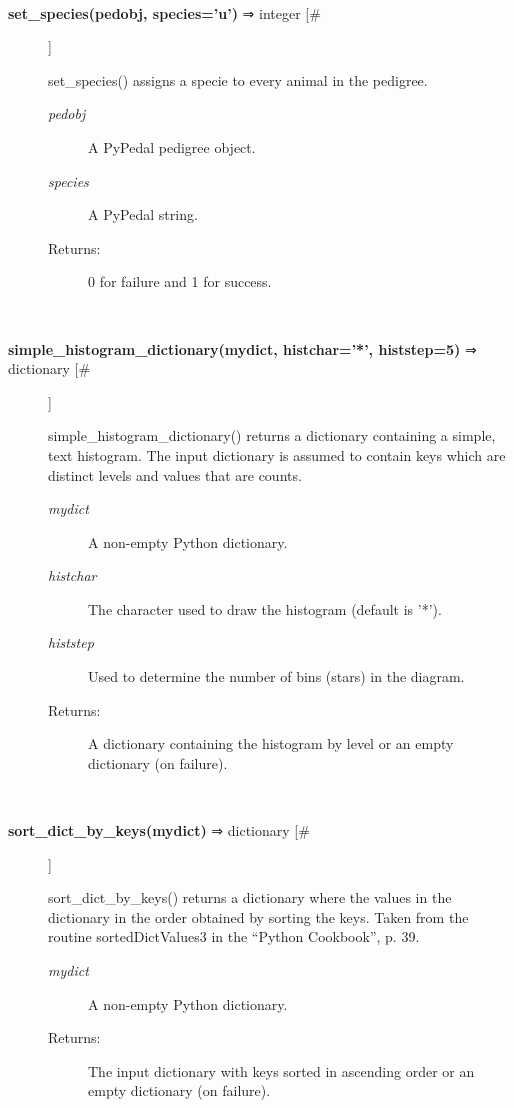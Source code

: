 \begin{description}
\begin{description}
\end{description}
\\ 

\item[\textbf{set\_species(pedobj, species='u')}
 ⇒ integer [\#]]

 set\_species() assigns a specie to every animal in the pedigree.
\begin{description}
\item[\emph{pedobj}
] A PyPedal pedigree object.
\item[\emph{species}
] A PyPedal string.
\item[Returns:] 0 for failure and 1 for success.

\end{description}
\\ 

\item[\textbf{simple\_histogram\_dictionary(mydict, histchar='*', histstep=5)}
 ⇒ dictionary [\#]]

 simple\_histogram\_dictionary() returns a dictionary containing a simple, text histogram. The input dictionary is assumed to contain keys which are distinct levels and values that are counts.
\begin{description}
\item[\emph{mydict}
] A non-empty Python dictionary.
\item[\emph{histchar}
] The character used to draw the histogram (default is '*').
\item[\emph{histstep}
] Used to determine the number of bins (stars) in the diagram.
\item[Returns:] A dictionary containing the histogram by level or an empty dictionary (on failure).

\end{description}
\\ 

\item[\textbf{sort\_dict\_by\_keys(mydict)}
 ⇒ dictionary [\#]]

 sort\_dict\_by\_keys() returns a dictionary where the values in the dictionary in the order obtained by sorting the keys. Taken from the routine sortedDictValues3 in the ``Python Cookbook'', p. 39.
\begin{description}
\item[\emph{mydict}
] A non-empty Python dictionary.
\item[Returns:] The input dictionary with keys sorted in ascending order or an empty dictionary (on failure).


\end{description}
\end{description}
